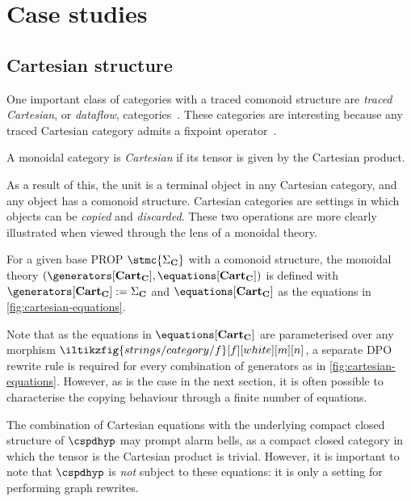 \section{Case studies}

\subsection{Cartesian structure}

One important class of categories with a traced comonoid structure are
\emph{traced Cartesian}, or \emph{dataflow},
categories~\cite{cazanescu1990new,hasegawa1997recursion}.
These categories are interesting because any traced Cartesian category admits a
fixpoint operator~\cite[Thm. 3.1]{hasegawa1997recursion}.

\begin{definition}
    A monoidal category is \emph{Cartesian} if its tensor is given by the
    Cartesian product.
\end{definition}

As a result of this, the unit is a terminal object in any Cartesian category,
and any object has a comonoid structure.
Cartesian categories are settings in which objects can be \emph{copied} and
\emph{discarded}.
These two operations are more clearly illustrated when viewed through the lens
of a monoidal theory.

\begin{definition}
    For a given base PROP \(\stmc{\Sigma_\mathbf{C}}\) with a comonoid
    structure, the monoidal theory \((
        \generators[\mathbf{Cart}_\mathbf{C}],
        \equations[\mathbf{Cart}_\mathbf{C}]
    )\) is defined with \(
        \generators[\mathbf{Cart}_\mathbf{C}] := \Sigma_\mathbf{C}
    \) and \(
        \equations[\mathbf{Cart}_\mathbf{C}]
    \) as the equations in \cref{fig:cartesian-equations}.
\end{definition}

Note that as the equations in \(\equations[\mathbf{Cart}_\mathbf{C}]\) are
parameterised over any morphism
\(\iltikzfig{strings/category/f}[f][white][m][n]\), a separate
DPO rewrite rule is required for every combination of generators as in
\cref{fig:cartesian-equations}.
However, as is the case in the next section, it is often possible to
characterise the copying behaviour through a finite number of equations.

\begin{remark}
    The combination of Cartesian equations with the underlying compact closed
    structure of \(\cspdhyp\) may prompt alarm bells, as a compact closed
    category in which the tensor is the Cartesian product is trivial.
    However, it is important to note that \(\cspdhyp\) is \emph{not} subject to
    these equations: it is only a setting for performing graph
    rewrites.
\end{remark}


